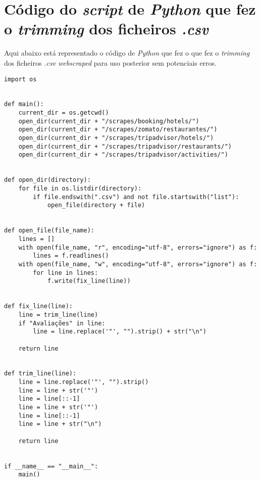 \chapter{Código do \textit{script} de \textit{Python} que fez o \textit{trimming} dos ficheiros \textit{.csv}}
\label{ap7}

Aqui abaixo está representado o código de \textit{Python} que fez o que fez o \textit{trimming} dos ficheiros \textit{.csv webscraped} para uso posterior sem potenciais erros.

\begin{verbatim}
import os


def main():
    current_dir = os.getcwd()
    open_dir(current_dir + "/scrapes/booking/hotels/")
    open_dir(current_dir + "/scrapes/zomato/restaurantes/")
    open_dir(current_dir + "/scrapes/tripadvisor/hotels/")
    open_dir(current_dir + "/scrapes/tripadvisor/restaurants/")
    open_dir(current_dir + "/scrapes/tripadvisor/activities/")


def open_dir(directory):
    for file in os.listdir(directory):
        if file.endswith(".csv") and not file.startswith("list"):
            open_file(directory + file)


def open_file(file_name):
    lines = []
    with open(file_name, "r", encoding="utf-8", errors="ignore") as f:
        lines = f.readlines()
    with open(file_name, "w", encoding="utf-8", errors="ignore") as f:
        for line in lines:
            f.write(fix_line(line))


def fix_line(line):
    line = trim_line(line)
    if "Avaliações" in line:
        line = line.replace('"', "").strip() + str("\n")

    return line


def trim_line(line):
    line = line.replace('"', "").strip()
    line = line + str('"')
    line = line[::-1]
    line = line + str('"')
    line = line[::-1]
    line = line + str("\n")

    return line


if __name__ == "__main__":
    main()

\end{verbatim}
